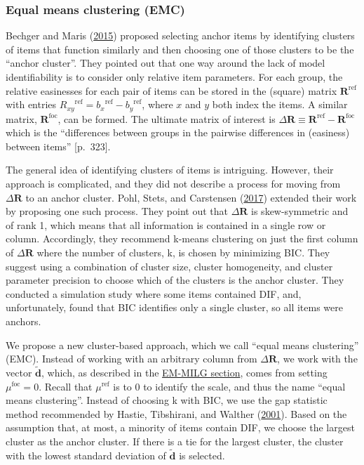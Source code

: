 \documentclass[
  11pt,
]{article}
\begin{document}
\hypertarget{equal-means-clustering-emc}{%
\subsubsection{Equal means clustering (EMC)}\label{equal-means-clustering-emc}}

Bechger and Maris (\protect\hyperlink{ref-bechger2015statistical}{2015}) proposed selecting anchor items by identifying clusters of items that function similarly and then choosing one of those clusters to be the \enquote{anchor cluster}. They pointed out that one way around the lack of model identifiability is to consider only relative item parameters. For each group, the relative easinesses for each pair of items can be stored in the (square) matrix \(\mathbf{R}^{\text{ref}}\) with entries \({R_{xy}}^{\text{ref}} = {b_x}^{\text{ref}} - {b_y}^{\text{ref}}\), where \(x\) and \(y\) both index the items. A similar matrix, \(\mathbf{R}^{\text{foc}}\), can be formed. The ultimate matrix of interest is \(\Delta \mathbf{R} \equiv \mathbf{R}^{\text{ref}}-\mathbf{R}^{\text{foc}}\) which is the \enquote{differences between groups in the pairwise differences in (easiness) between items} {[}p.~323{]}.

The general idea of identifying clusters of items is intriguing. However, their approach is complicated, and they did not describe a process for moving from \(\Delta \mathbf{R}\) to an anchor cluster. Pohl, Stets, and Carstensen (\protect\hyperlink{ref-pohl2017cluster}{2017}) extended their work by proposing one such process. They point out that \(\Delta \mathbf{R}\) is skew-symmetric and of rank 1, which means that all information is contained in a single row or column. Accordingly, they recommend k-means clustering on just the first column of \(\Delta \mathbf{R}\) where the number of clusters, k, is chosen by minimizing BIC. They suggest using a combination of cluster size, cluster homogeneity, and cluster parameter precision to choose which of the clusters is the anchor cluster. They conducted a simulation study where some items contained DIF, and, unfortunately, found that BIC identifies only a single cluster, so all items were anchors.

We propose a new cluster-based approach, which we call \enquote{equal means clustering} (EMC). Instead of working with an arbitrary column from \(\Delta \mathbf{R}\), we work with the vector \(\tilde{\mathbf{d}}\), which, as described in the \protect\hyperlink{emmilg}{EM-MILG section}, comes from setting \(\mu^\text{foc} = 0\). Recall that \(\mu^\text{ref}\) is to \(0\) to identify the scale, and thus the name \enquote{equal means clustering}. Instead of choosing k with BIC, we use the gap statistic method recommended by Hastie, Tibshirani, and Walther (\protect\hyperlink{ref-hastie2001estimating}{2001}). Based on the assumption that, at most, a minority of items contain DIF, we choose the largest cluster as the anchor cluster. If there is a tie for the largest cluster, the cluster with the lowest standard deviation of \(\tilde{\mathbf{d}}\) is selected.
\end{document}

